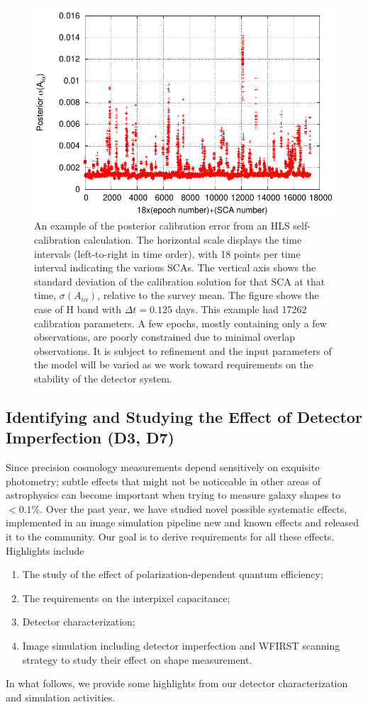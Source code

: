 \begin{figure}
\includegraphics[width=4.5in]{Plots/hcalfig.pdf}
\caption{\label{fig:hcalfig}An example of the posterior calibration error from an HLS self-calibration calculation. The horizontal scale displays the time intervals (left-to-right in time order), with 18 points per time interval indicating the various SCAs. The vertical axis shows the standard deviation of the calibration solution for that SCA at that time, $\sigma(A_{i\alpha})$, relative to the survey mean. The figure shows the case of H band with $\Delta t = 0.125$ days. This example had 17262 calibration parameters. A few epochs, mostly containing only a few observations, are poorly constrained due to minimal overlap observations. It is subject to refinement and the input parameters of the model will be varied as we work toward requirements on the stability of the detector system.}
\end{figure}


\subsection{Identifying and Studying the Effect of Detector Imperfection (D3, D7)}
\label{sec:wl_detectors}
\begin{summaryii}
  Since precision cosmology measurements depend sensitively on exquisite photometry; subtle effects that
  might not be noticeable in other areas of astrophysics can become important
  when trying to measure galaxy shapes to $<0.1$\%. Over the past year, we have
  studied novel possible systematic effects, implemented in an image
  simulation pipeline new and known effects and released it to the community. Our goal is to derive requirements for all these effects. Highlights include
  \begin{enumerate}
  \item The study of the effect of polarization-dependent quantum efficiency;
  \item The requirements on the interpixel capacitance;
  \item Detector characterization;
  \item Image simulation including detector imperfection and WFIRST scanning strategy to study their effect on shape measurement.
\end{enumerate}
In what follows, we provide some highlights from our detector characterization and simulation activities.
\end{summaryii}


